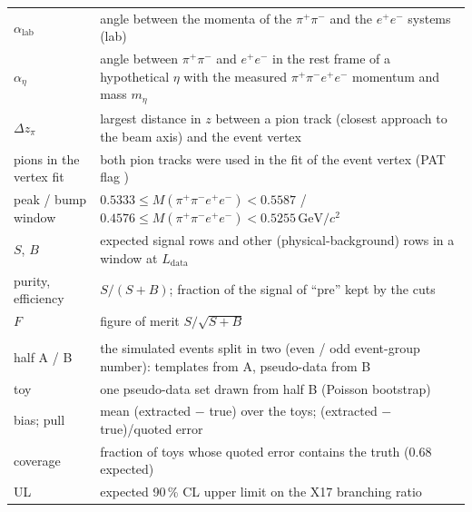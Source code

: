 \documentclass[11pt,a4paper]{article}
\newcommand{\ee}{\ensuremath{e^{+}e^{-}}\xspace}
\newcommand{\pipi}{\ensuremath{\pi^{+}\pi^{-}}\xspace}
\newcommand{\ppee}{\ensuremath{\pi^{+}\pi^{-}e^{+}e^{-}}\xspace}
\newcommand{\Mfour}{\ensuremath{M(\pi^{+}\pi^{-}e^{+}e^{-})}\xspace}
\newcommand{\GeVcc}{\ensuremath{\mathrm{GeV}/c^{2}}\xspace}
\newcommand{\Ldata}{\ensuremath{L_{\mathrm{data}}}\xspace}
\newcommand{\code}[1]{\texttt{\detokenize{#1}}}
\begin{document}
{\begin{longtable}{@{}>{\raggedright\arraybackslash}p{3.3cm} >{\raggedright\arraybackslash}p{\dimexpr\textwidth-3.3cm-2\tabcolsep\relax}@{}}
$\alpha_{\mathrm{lab}}$ & angle between the momenta of the \pipi and the \ee systems (lab) \\
$\alpha_\eta$ & angle between \pipi and \ee in the rest frame of a hypothetical $\eta$ with the measured \ppee momentum and mass $m_\eta$ \\
$\Delta z_\pi$ & largest distance in $z$ between a pion track (closest approach to the beam axis) and the event vertex \\
pions in the vertex fit & both pion tracks were used in the fit of the event vertex (PAT flag \code{isUsedVertex}) \\
peak / bump window & $0.5333\le\Mfour<0.5587$ / $0.4576\le\Mfour<0.5255$\,\GeVcc \\
$S$, $B$ & expected signal rows and other (physical-background) rows in a window at \Ldata \\
purity, efficiency & $S/(S+B)$; fraction of the signal of ``pre'' kept by the cuts \\
$F$ & figure of merit $S/\sqrt{S+B}$ \\
\midrule
\multicolumn{2}{@{}l}{\textbf{Test of the extraction}} \\
half A / B & the simulated events split in two (even / odd event-group number): templates from A, pseudo-data from B \\
toy & one pseudo-data set drawn from half B (Poisson bootstrap) \\
bias; pull & mean (extracted $-$ true) over the toys; (extracted $-$ true)/quoted error \\
coverage & fraction of toys whose quoted error contains the truth (0.68 expected) \\
UL & expected 90\,\% CL upper limit on the X17 branching ratio \\
\bottomrule
\end{longtable}
}

\end{document}
